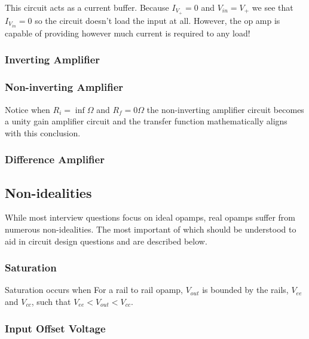 \documentclass[main.tex]{subfiles}
\begin{document}
This circuit acts as a current buffer. Because $I_{V_{+}} = 0$ and $V_{in} = V_{+}$ we see that $I_{V_{in}} = 0$ so the circuit doesn't load the input at all. However, the op amp is capable of providing however much current is required to any load! 

\subsubsection{Inverting Amplifier}


\subsubsection{Non-inverting Amplifier}


Notice when $R_i = \inf \Omega$ and $R_f = 0 \Omega$ the non-inverting amplifier circuit becomes a unity gain amplifier circuit and the transfer function mathematically aligns with this conclusion.

\subsubsection{Difference Amplifier}



\subsection{Non-idealities}
While most interview questions focus on ideal opamps, real opamps suffer from numerous non-idealities. The most important of which should be understood to aid in circuit design questions and are described below. 

\subsubsection{Saturation}
Saturation occurs when 
For a rail to rail opamp, $V_{out}$ is bounded by the rails, $V_{ee}$ and $V_{cc}$, such that $V_{ee} < V_{out} < V_{cc}$. 

\subsubsection{Input Offset Voltage}
\end{document}
